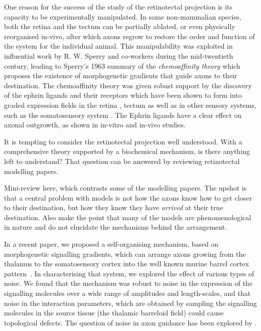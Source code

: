 \documentclass[11pt, a4paper]{article}
\begin{document}
One reason for the success of the study of the retinotectal projection is its
capacity to be experimentally manipulated. In some non-mammalian species, both
the retina and the tectum can be partially ablated, or even physically
reorganised in-vivo, after which axons regrow to restore the order and
function of the system for the individual animal. This manipulability was
exploited in influential work by R. W. Sperry and co-workers during the
mid-twentieth century, leading to Sperry's 1963 summary of
the \emph{chemoaffinity theory} \citep{sperry_chemoaffinity_1963} which
proposes the existence of morphogenetic gradients that guide axons to their
destination. The chemoaffinity theory was given robust support by the
discovery of the ephrin ligands and their receptors \citep{cheng_complementary_1995,drescher_vitro_1995}
which have been shown to form into graded expression fields in the
retina \citep{braisted_graded_1997}, tectum \citep{braisted_graded_1997,feldheim_genetic_2000} as well as in other
sensory systems, such as the somatosensory
system \citep{vanderhaeghen_mapping_2000}. The Ephrin ligands have a clear
effect on axonal outgrowth, as shown in in-vitro \citep{cheng_complementary_1995,drescher_vitro_1995,hansen_retinal_2004} and
in-vivo \citep{frisen_ephrin-a5_1998,rodger_transient_2000,mann_topographic_2002,hindges_ephb_2002} studies.
%
%
%
%
%
%
%
%

It is tempting to consider the retinotectal projection well understood. With a
comprehensive theory supported by a biochemical mechanism, is there anything
left to understand? That question can be answered by reviewing retinotectal
modelling papers.

Mini-review here, which contrasts some of the modelling papers. The upshot is
that a central problem with models is not how the axons know how to get closer
to their destination, but how they know they have \emph{arrived} at their true
destination. Also make the point that many of the models are phenomenological
in nature and do not elucidate the mechanisms behind the arrangement.

In a recent paper, we proposed a self-organising mechanism, based on
morphogenetic signalling gradients, which can arrange
axons growing from the thalamus to the somatosensory cortex into the well
known murine barrel cortex pattern~\citep{james_modelling_2020}. In
characterising that system, we explored the effect of various types of
noise. We found that the mechanism was robust to noise in the expression of
the signalling molecules over a wide range of amplitudes and length-scales,
and that noise in the interaction parameters, which are obtained by sampling
the signalling molecules in the source tissue (the thalamic barreloid field)
could cause topological defects. The question of noise in axon guidance has
been explored by \citet{goodhill_can_2016}.
\end{document}
